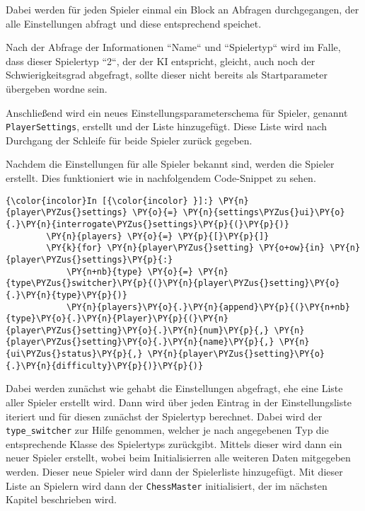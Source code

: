     Dabei werden für jeden Spieler einmal ein Block an Abfragen
durchgegangen, der alle Einstellungen abfragt und diese entsprechend
speichet.

Nach der Abfrage der Informationen ``Name`` und ``Spielertyp`` wird im
Falle, dass dieser Spielertyp ``2``, der der KI entspricht, gleicht, auch
noch der Schwierigkeitsgrad abgefragt, sollte dieser nicht bereits als
Startparameter übergeben wordne sein.

Anschließend wird ein neues Einstellungsparameterschema für Spieler,
genannt \texttt{PlayerSettings}, erstellt und der Liste hinzugefügt.
Diese Liste wird nach Durchgang der Schleife für beide Spieler zurück
gegeben.

Nachdem die Einstellungen für alle Spieler bekannt sind, werden die
Spieler erstellt. Dies funktioniert wie in nachfolgendem Code-Snippet zu
sehen.

    \begin{Verbatim}[commandchars=\\\{\}]
{\color{incolor}In [{\color{incolor} }]:} \PY{n}{player\PYZus{}settings} \PY{o}{=} \PY{n}{settings\PYZus{}ui}\PY{o}{.}\PY{n}{interrogate\PYZus{}settings}\PY{p}{(}\PY{p}{)}
        \PY{n}{players} \PY{o}{=} \PY{p}{[}\PY{p}{]}
        \PY{k}{for} \PY{n}{player\PYZus{}setting} \PY{o+ow}{in} \PY{n}{player\PYZus{}settings}\PY{p}{:}
            \PY{n+nb}{type} \PY{o}{=} \PY{n}{type\PYZus{}switcher}\PY{p}{(}\PY{n}{player\PYZus{}setting}\PY{o}{.}\PY{n}{type}\PY{p}{)}
            \PY{n}{players}\PY{o}{.}\PY{n}{append}\PY{p}{(}\PY{n+nb}{type}\PY{o}{.}\PY{n}{Player}\PY{p}{(}\PY{n}{player\PYZus{}setting}\PY{o}{.}\PY{n}{num}\PY{p}{,} \PY{n}{player\PYZus{}setting}\PY{o}{.}\PY{n}{name}\PY{p}{,} \PY{n}{ui\PYZus{}status}\PY{p}{,} \PY{n}{player\PYZus{}setting}\PY{o}{.}\PY{n}{difficulty}\PY{p}{)}\PY{p}{)}
\end{Verbatim}

    Dabei werden zunächst wie gehabt die Einstellungen abgefragt, ehe eine
Liste aller Spieler erstellt wird. Dann wird über jeden Eintrag in der
Einstellungsliste iteriert und für diesen zunächst der Spielertyp
berechnet. Dabei wird der \texttt{type\_switcher} zur Hilfe genommen,
welcher je nach angegebenen Typ die entsprechende Klasse des Spielertyps
zurückgibt. Mittels dieser wird dann ein neuer Spieler erstellt, wobei
beim Initialisierren alle weiteren Daten mitgegeben werden. Dieser neue
Spieler wird dann der Spielerliste hinzugefügt. Mit dieser Liste an
Spielern wird dann der \texttt{ChessMaster} initialisiert, der im
nächsten Kapitel beschrieben wird.

